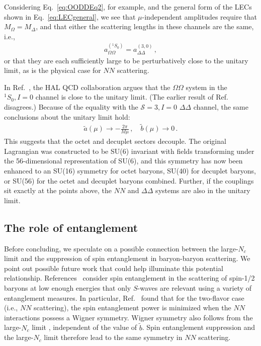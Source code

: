 \documentclass[nofootinbib, preprint, aps, prc, superscriptaddress,11pt]{revtex4-1}
\newcommand{\Nc}{\ensuremath{N_c}\xspace}
\newcommand{\NN}{\ensuremath{N\!N}\xspace}
\newcommand{\oneS}{\ensuremath{{{}^{1}\!S_0}}\xspace}
\newcommand{\1}{\mathbbm{1}}
\newcommand{\at}{\ensuremath{\tilde{a}}\xspace}
\newcommand{\bt}{\ensuremath{\tilde{b}}\xspace}
\newcommand{\aOOsing}{\ensuremath{a_{\OO}^{(\oneS)}}\xspace}
\newcommand{\D}{\ensuremath{\Delta}\xspace}
\newcommand{\DD}{\ensuremath{\Delta\Delta}\xspace}
\newcommand{\OO}{\ensuremath{\Omega\Omega}\xspace}
\begin{document}
Considering Eq.~\eqref{eq:OODDEq2}, for example, and the general form of the LECs shown in Eq.~\eqref{eq:LECgeneral}, we see that $\mu$-independent amplitudes require that $M_\Omega=M_\D$, and that either the scattering lengths in these channels are the same, i.e.,
\begin{align}
    \aOOsing =  a_{\DD}^{(3,0)} \, ,
\end{align}
or that they are each sufficiently large to be perturbatively close to the unitary limit, as is the physical case for \NN scattering.

In Ref.~\cite{Gongyo:2017fjb}, the HAL QCD collaboration argues that the \OO system in the $\oneS, I=0$ channel is close to the unitary limit.
(The earlier result of Ref.~\cite{Buchoff:2012ja} disagrees.)
Because of the equality with the $\mathscr{S}=3,I=0$ \DD channel, the same conclusions about the unitary limit hold:
    \begin{align}
        \at(\mu) \to -\frac{2 \pi}{M \mu}\, , \quad \bt(\mu)  \to 0\, . 
    \end{align}
This suggests that the octet and decuplet  sectors decouple.
The original Lagrangian was constructed to be SU(6) invariant with fields transforming under the 56-dimensional representation of SU(6), and this symmetry has now been enhanced to an SU(16) symmetry for octet baryons, SU(40) for decuplet baryons, or SU(56) for the octet and decuplet baryons combined.
Further, if the couplings sit exactly at the points above,  the \NN and \DD systems are also in the unitary limit.




\subsection{The role of entanglement}
\label{sec:entangle}

Before concluding, we speculate on a possible connection between the large-\Nc limit and the suppression of spin entanglement in baryon-baryon scattering. We point out possible future work that could help illuminate this potential relationship.
References~\cite{Beane:2018oxh,Low:2021ufv,Liu:2022grf,Bai:2023tey,Miller:2023ujx} consider spin entanglement in the scattering of spin-1/2 baryons at low enough energies that only $S$-waves are relevant using a variety of entanglement measures. 
In particular, Ref.~\cite{Beane:2018oxh} found that for the two-flavor case (i.e., \NN scattering), the spin entanglement power \cite{Zanardi:2001zza,Ballard:2011} is minimized when the \NN interactions possess a Wigner symmetry. 
Wigner symmetry also follows from the large-\Nc limit \cite{Kaplan:1995yg}, independent of the value of \bt. 
Spin entanglement suppression and the large-\Nc limit therefore lead to the same symmetry in \NN scattering.
\end{document}
